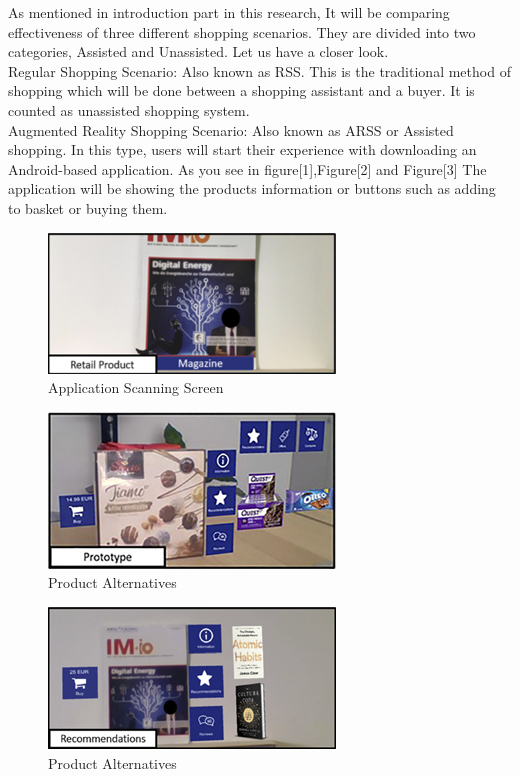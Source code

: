 \documentclass[letterpaper, 10 pt, conference]{ieeeconf}
\begin{document}
As mentioned in introduction part in this research, It will be comparing effectiveness of three different shopping scenarios. They are divided into two categories, Assisted and Unassisted. Let us have a closer look.\\
Regular Shopping Scenario: Also known as RSS. This is the traditional method of shopping which will be done between a shopping assistant and a buyer. It is counted as unassisted shopping system.\\
Augmented Reality Shopping Scenario: Also known as ARSS or Assisted shopping. In this type, users will start their experience with downloading an Android-based application. As you see in figure[1],Figure[2] and Figure[3] The application will be showing the products information or buttons such as adding to basket or buying them.
\begin{figure}[!ht]
    \centering
    \includegraphics{Picture1.png}
    \caption{Application Scanning Screen}
\end{figure}
\begin{figure}[!ht]
    \centering
    \includegraphics{Picture2.png}
    \caption{Product Alternatives}
\end{figure}
\begin{figure}[!ht]
    \centering
    \includegraphics{Picture3.png}
    \caption{Product Alternatives}
\end{figure}
\end{document}
